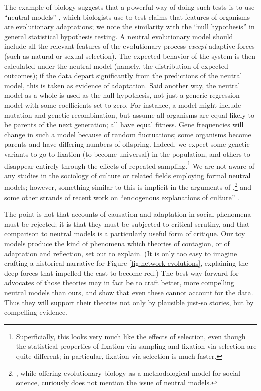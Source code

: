 \documentclass{article}
\begin{document}
\begin{multicols}{2}
The example of biology suggests that a powerful way of doing such tests is to
use ``neutral models'' \citep{Harvey-Pagel, Gillespie-pop-gen}, which biologists
use to test claims that features of organisms are evolutionary adaptations; we
note the similarity with the ``null hypothesis'' in general statistical
hypothesis testing.  A neutral evolutionary model should include all the
relevant features of the evolutionary process {\em except} adaptive forces
(such as natural or sexual selection).  The expected behavior of the system is
then calculated under the neutral model (namely, the distribution of expected
outcomes); if the data depart significantly from the predictions of the neutral
model, this is taken as evidence of adaptation.  Said another way, the neutral
model as a whole is used as the null hypothesis, not just a generic regression
model with some coefficients set to zero.  For instance, a model might include
mutation and genetic recombination, but assume all organisms are equal likely
to be parents of the next generation; all have equal fitness.  Gene frequencies
will change in such a model because of random fluctuations; some organisms
become parents and have differing numbers of offspring. Indeed, we expect some
genetic variants to go to fixation (to become universal) in the population, and
others to disappear entirely through the effects of repeated
sampling.\footnote{Superficially, this looks very much like the effects of
  selection, even though the statistical properties of fixation via sampling
  and fixation via selection are quite different; in particular, fixation via
  selection is much faster.} We are not aware of any studies in the sociology
of culture or related fields employing formal neutral models; however,
something similar to this is implicit in the arguments of
\citet{Lieberson-matter-of-taste},\footnote{\citet{Lieberson-Lynn-wrong-branch},
  while offering evolutionary biology as a methodological model for social
  science, curiously does not mention the issue of neutral models.} and some
other strands of recent work on ``endogenous explanations of culture''
\citep{Kaufman-endogenous}.

The point is not that accounts of causation and adaptation in social phenomena
must be rejected; it is that they must be subjected to critical scrutiny, and
that comparison to neutral models is a particularly useful form of critique.
Our toy models produce the kind of phenomena which theories of contagion, or of
adaptation and reflection, set out to explain.  (It is only too easy to imagine
crafting a historical narrative for Figure \ref{fig:network-evolutions},
explaining the deep forces that impelled the east to become red.)  The best way
forward for advocates of those theories may in fact be to craft better, more
compelling neutral models than ours, and show that even these cannot account
for the data.  Thus they will support their theories not only by plausible
just-so stories, but by compelling evidence.



\end{multicols}
\end{document}
